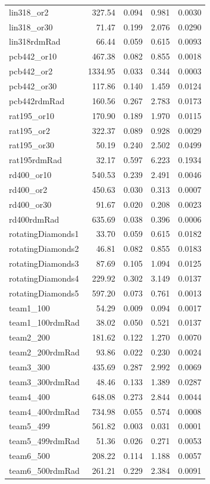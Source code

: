 \documentclass[11pt]{article}
\begin{document}
\begin{longtable}{lrrrr}
lin318\_or2 & 327.54 & 0.094 & 0.981 & 0.0030 \\
lin318\_or30 & 71.47 & 0.199 & 2.076 & 0.0290 \\
lin318rdmRad & 66.44 & 0.059 & 0.615 & 0.0093 \\
pcb442\_or10 & 467.38 & 0.082 & 0.855 & 0.0018 \\
pcb442\_or2 & 1334.95 & 0.033 & 0.344 & 0.0003 \\
pcb442\_or30 & 117.86 & 0.140 & 1.459 & 0.0124 \\
pcb442rdmRad & 160.56 & 0.267 & 2.783 & 0.0173 \\
rat195\_or10 & 170.90 & 0.189 & 1.970 & 0.0115 \\
rat195\_or2 & 322.37 & 0.089 & 0.928 & 0.0029 \\
rat195\_or30 & 50.19 & 0.240 & 2.502 & 0.0499 \\
rat195rdmRad & 32.17 & 0.597 & 6.223 & 0.1934 \\
rd400\_or10 & 540.53 & 0.239 & 2.491 & 0.0046 \\
rd400\_or2 & 450.63 & 0.030 & 0.313 & 0.0007 \\
rd400\_or30 & 91.67 & 0.020 & 0.208 & 0.0023 \\
rd400rdmRad & 635.69 & 0.038 & 0.396 & 0.0006 \\
rotatingDiamonds1 & 33.70 & 0.059 & 0.615 & 0.0182 \\
rotatingDiamonds2 & 46.81 & 0.082 & 0.855 & 0.0183 \\
rotatingDiamonds3 & 87.69 & 0.105 & 1.094 & 0.0125 \\
rotatingDiamonds4 & 229.92 & 0.302 & 3.149 & 0.0137 \\
rotatingDiamonds5 & 597.20 & 0.073 & 0.761 & 0.0013 \\
team1\_100 & 54.29 & 0.009 & 0.094 & 0.0017 \\
team1\_100rdmRad & 38.02 & 0.050 & 0.521 & 0.0137 \\
team2\_200 & 181.62 & 0.122 & 1.270 & 0.0070 \\
team2\_200rdmRad & 93.86 & 0.022 & 0.230 & 0.0024 \\
team3\_300 & 435.69 & 0.287 & 2.992 & 0.0069 \\
team3\_300rdmRad & 48.46 & 0.133 & 1.389 & 0.0287 \\
team4\_400 & 648.08 & 0.273 & 2.844 & 0.0044 \\
team4\_400rdmRad & 734.98 & 0.055 & 0.574 & 0.0008 \\
team5\_499 & 561.82 & 0.003 & 0.031 & 0.0001 \\
team5\_499rdmRad & 51.36 & 0.026 & 0.271 & 0.0053 \\
team6\_500 & 208.22 & 0.114 & 1.188 & 0.0057 \\
team6\_500rdmRad & 261.21 & 0.229 & 2.384 & 0.0091 \\
\end{longtable}
\endgroup
\end{document}
